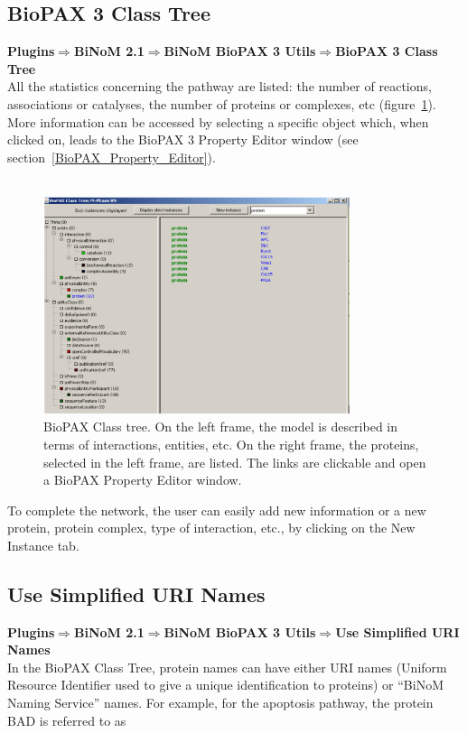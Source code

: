 \subsection{BioPAX 3 Class Tree}
\textbf{Plugins$\Rightarrow$BiNoM 2.1$\Rightarrow$BiNoM BioPAX 3 Utils$\Rightarrow$BioPAX 3 Class
Tree}\\
All the statistics concerning the pathway are listed: the number of reactions,
associations or catalyses, the number of proteins or complexes, etc
(figure~\ref{BioPAX_Class_Tree}). More information can be accessed by selecting
a specific object which, when clicked on, leads to the BioPAX 3 Property Editor
window (see section~\ref{BioPAX_Property_Editor}).\\\\
\begin{figure}[h]
\centering
\includegraphics[width=0.8\textwidth]{graphics/BioPAX_Class_Tree}
\caption{BioPAX Class tree. On the left frame, the model is described in terms
of interactions, entities, etc. On the right frame, the proteins, selected in
the left frame, are listed. The links are clickable and open a BioPAX Property
Editor window.}
\label{BioPAX_Class_Tree}
\end{figure}
To complete the network, the user can easily add new information or a new
protein, protein complex, type of interaction, etc., by clicking on the New
Instance tab.

\subsection{Use Simplified URI Names}
\textbf{Plugins$\Rightarrow$BiNoM 2.1$\Rightarrow$BiNoM BioPAX 3 Utils$\Rightarrow$Use Simplified URI Names}\\

In the BioPAX Class Tree, protein names can have either URI names (Uniform Resource Identifier used to give a unique identification to proteins) or “BiNoM Naming Service” names. For example, for the apoptosis pathway, the protein BAD is referred to as\\

